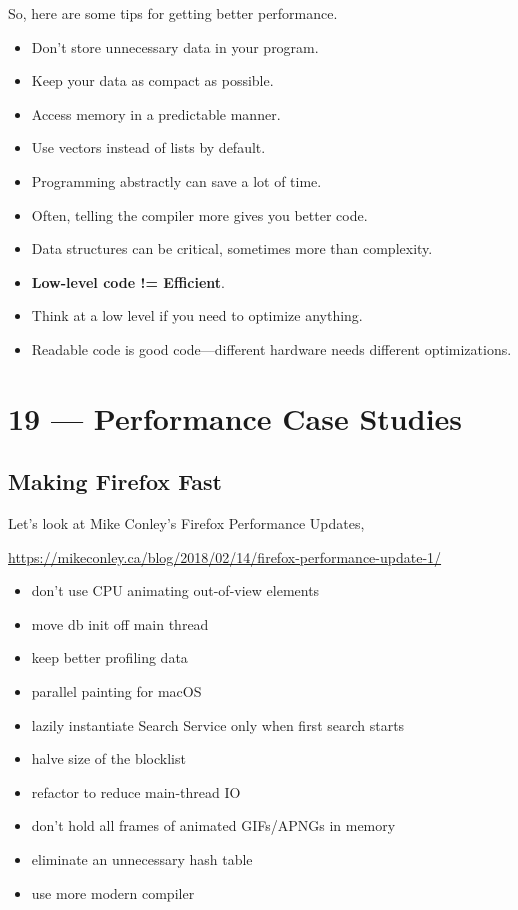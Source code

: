 \documentclass[a4paper]{report}
\begin{document}
So, here are some tips for getting better performance.
  \begin{itemize}
    \item Don't store unnecessary data in your program.
    \item Keep your data as compact as possible.
    \item Access memory in a predictable manner.
    \item Use vectors instead of lists by default.
    \item Programming abstractly can save a lot of time.
    \item Often, telling the compiler more gives you better code.
    \item Data structures can be critical, sometimes more than complexity.
    \item {\bf Low-level code != Efficient}.
    \item Think at a low level if you need to optimize anything.
    \item Readable code is good code---different hardware needs different
      optimizations.
  \end{itemize}










\chapter*{19 --- Performance Case Studies}


\section*{Making Firefox Fast}

Let's look at Mike Conley's Firefox Performance Updates,
\begin{center}
{\scriptsize
\vspace*{-1em}
\url{https://mikeconley.ca/blog/2018/02/14/firefox-performance-update-1/}
}
\end{center}
\vspace*{-1em}

\begin{itemize}[noitemsep]
\item don't use CPU animating out-of-view elements
\item move db init off main thread
\item keep better profiling data
\item parallel painting for macOS
\item lazily instantiate Search Service only when first search starts
\item halve size of the blocklist
\item refactor to reduce main-thread IO
\item don't hold all frames of animated GIFs/APNGs in memory
\item eliminate an unnecessary hash table
\item use more modern compiler
\end{itemize}
\end{document}
